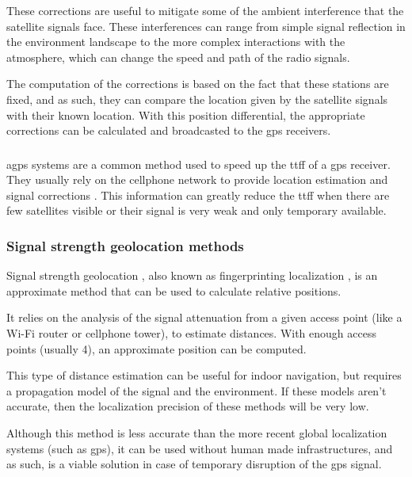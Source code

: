 These corrections are useful to mitigate some of the ambient interference that the satellite signals face. These interferences can range from simple signal reflection in the environment landscape to the more complex interactions with the atmosphere, which can change the speed and path of the radio signals.

The computation of the corrections \cite{Kim2007} is based on the fact that these stations are fixed, and as such, they can compare the location given by the satellite signals with their known location. With this position differential, the appropriate corrections can be calculated and broadcasted to the \gls{gps} receivers.


\subsubsection{}

\gls{agps} systems are a common method used to speed up the \gls{ttff} of a \gls{gps} receiver. They usually rely on the cellphone network to provide location estimation and signal corrections \cite{R.1948}. This information can greatly reduce the \gls{ttff} when there are few satellites visible or their signal is very weak and only temporary available.


\subsubsection{Signal strength geolocation methods}

Signal strength geolocation \cite{Kobayashi2002}, also known as fingerprinting localization \cite{Bshara2010}, is an approximate method that can be used to calculate relative positions.

It relies on the analysis of the signal attenuation from a given access point (like a Wi-Fi router or cellphone tower), to estimate distances. With enough access points (usually 4), an approximate position can be computed.

This type of distance estimation can be useful for indoor navigation, but requires a propagation model of the signal and the environment. If these models aren't accurate, then the localization precision of these methods will be very low.

Although this method is less accurate than the more recent global localization systems (such as \gls{gps}), it can be used without human made infrastructures, and as such, is a viable solution in case of temporary disruption of the \gls{gps} signal.


